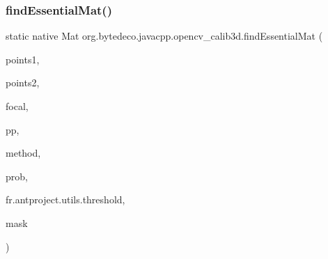 \subsubsection{\texorpdfstring{find\+Essential\+Mat()}{findEssentialMat()}\hspace{0.1cm}{\footnotesize\ttfamily [2/2]}}
{\footnotesize\ttfamily static native Mat org.\+bytedeco.\+javacpp.\+opencv\+\_\+calib3d.\+find\+Essential\+Mat (\begin{DoxyParamCaption}\item[{@By\+Val Mat}]{points1,  }\item[{@By\+Val Mat}]{points2,  }\item[{double}]{focal,  }\item[{@By\+Val(null\+Value=\char`\"{}cv\+::\+Point2d(0, 0)\char`\"{}) Point2d}]{pp,  }\item[{int}]{method,  }\item[{double}]{prob,  }\item[{double}]{fr.antproject.utils.threshold,  }\item[{@By\+Val(null\+Value=\char`\"{}cv\+::\+Output\+Array(cv\+::no\+Array())\char`\"{}) Mat}]{mask }\end{DoxyParamCaption})\hspace{0.3cm}{\ttfamily [static]}}

